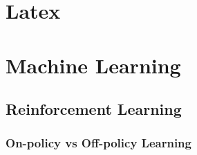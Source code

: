 \documentclass[]{book}
\begin{document}
\tableofcontents

\chapter{Latex}


\chapter{Machine Learning}

\section{Reinforcement Learning}

\subsection{On-policy vs Off-policy Learning}
\end{document}
